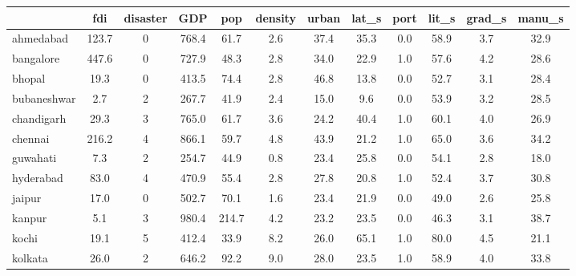 {
\def\sym#1{\ifmmode^{#1}\else\(^{#1}\)\fi}
\begin{tabular}{l*{1}{ccccccccccc}}
\hline\hline
            &         fdi&    disaster&         GDP&         pop&     density&       urban&       lat\_s&        port&       lit\_s&      grad\_s&      manu\_s\\
\hline
ahmedabad   &       123.7&           0&       768.4&        61.7&         2.6&        37.4&        35.3&         0.0&        58.9&         3.7&        32.9\\
bangalore   &       447.6&           0&       727.9&        48.3&         2.8&        34.0&        22.9&         1.0&        57.6&         4.2&        28.6\\
bhopal      &        19.3&           0&       413.5&        74.4&         2.8&        46.8&        13.8&         0.0&        52.7&         3.1&        28.4\\
bubaneshwar &         2.7&           2&       267.7&        41.9&         2.4&        15.0&         9.6&         0.0&        53.9&         3.2&        28.5\\
chandigarh  &        29.3&           3&       765.0&        61.7&         3.6&        24.2&        40.4&         1.0&        60.1&         4.0&        26.9\\
chennai     &       216.2&           4&       866.1&        59.7&         4.8&        43.9&        21.2&         1.0&        65.0&         3.6&        34.2\\
guwahati    &         7.3&           2&       254.7&        44.9&         0.8&        23.4&        25.8&         0.0&        54.1&         2.8&        18.0\\
hyderabad   &        83.0&           4&       470.9&        55.4&         2.8&        27.8&        20.8&         1.0&        52.4&         3.7&        30.8\\
jaipur      &        17.0&           0&       502.7&        70.1&         1.6&        23.4&        21.9&         0.0&        49.0&         2.6&        25.8\\
kanpur      &         5.1&           3&       980.4&       214.7&         4.2&        23.2&        23.5&         0.0&        46.3&         3.1&        38.7\\
kochi       &        19.1&           5&       412.4&        33.9&         8.2&        26.0&        65.1&         1.0&        80.0&         4.5&        21.1\\
kolkata     &        26.0&           2&       646.2&        92.2&         9.0&        28.0&        23.5&         1.0&        58.9&         4.0&        33.8\\

\end{tabular}}
